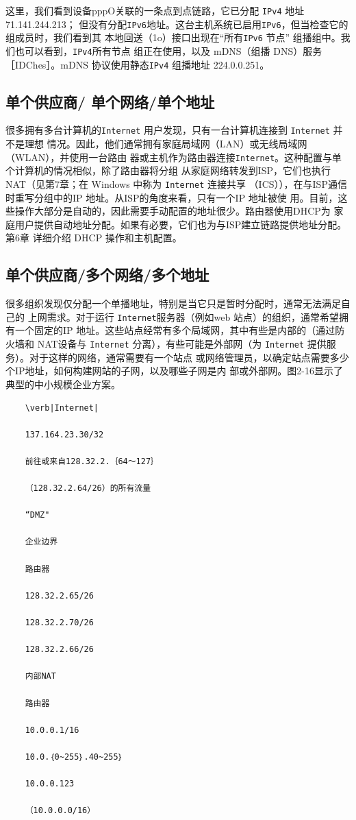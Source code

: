 这里，我们看到设备pppO关联的一条点到点链路，它已分配 \verb|IPv4| 地址 71.141.244.213；
但没有分配\verb|IPv6|地址。这台主机系统已启用\verb|IPv6|，但当检查它的组成员时，我们看到其
本地回送（1o）接口出现在“所有\verb|IPv6| 节点” 组播组中。我们也可以看到，\verb|IPv4|所有节点
组正在使用，以及 mDNS（组播 DNS）服务［IDChes］。mDNS 协议使用静态\verb|IPv4| 组播地址
224.0.0.251。

\subsection{单个供应商/ 单个网络/单个地址}
很多拥有多台计算机的\verb|Internet| 用户发现，只有一台计算机连接到 \verb|Internet| 并不是理想
情况。因此，他们通常拥有家庭局域网（LAN）或无线局域网（WLAN），并使用一台路由
器或主机作为路由器连接\verb|Internet|。这种配置与单个计算机的情况相似，除了路由器将分组
从家庭网络转发到ISP，它们也执行 NAT（见第7章；在 Windows 中称为 \verb|Internet| 连接共享
（ICS）），在与ISP通信时重写分组中的IP 地址。从ISP的角度来看，只有一个IP 地址被使
用。目前，这些操作大部分是自动的，因此需要手动配置的地址很少。路由器使用DHCP为
家庭用户提供自动地址分配。如果有必要，它们也为与ISP建立链路提供地址分配。第6章
详细介绍 DHCP 操作和主机配置。

\subsection{单个供应商/多个网络/多个地址}

很多组织发现仅分配一个单播地址，特别是当它只是暂时分配时，通常无法满足自己的
上网需求。对于运行 \verb|Internet|服务器（例如web 站点）的组织，通常希望拥有一个固定的IP
地址。这些站点经常有多个局域网，其中有些是内部的（通过防火墙和 NAT设备与 \verb|Internet|
分离），有些可能是外部网（为 \verb|Internet| 提供服务）。对于这样的网络，通常需要有一个站点
或网络管理员，以确定站点需要多少个IP地址，如何构建网站的子网，以及哪些子网是内
部或外部网。图2-16显示了典型的中小规模企业方案。

\begin{verbatim}
    \verb|Internet|
    
    137.164.23.30/32
    
    前往或来自128.32.2.｛64～127｝
    
    （128.32.2.64/26）的所有流量
    
    “DMZ"
    
    企业边界
    
    路由器
    
    128.32.2.65/26
    
    128.32.2.70/26
    
    128.32.2.66/26
    
    内部NAT
    
    路由器
    
    10.0.0.1/16
    
    10.0.｛0~255｝.40~255｝
    
    10.0.0.123
    
    （10.0.0.0/16）
\end{verbatim}

